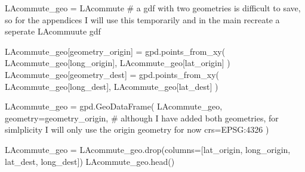 \documentclass[
  number]{elsarticle}
\newenvironment{Shaded}{\begin{snugshade}}{\end{snugshade}}
\newcommand{\CommentTok}[1]{\textcolor[rgb]{0.37,0.37,0.37}{#1}}
\newcommand{\NormalTok}[1]{\textcolor[rgb]{0.00,0.23,0.31}{#1}}
\newcommand{\OperatorTok}[1]{\textcolor[rgb]{0.37,0.37,0.37}{#1}}
\newcommand{\StringTok}[1]{\textcolor[rgb]{0.13,0.47,0.30}{#1}}
\begin{document}
\begin{Shaded}
\begin{Highlighting}[]
\NormalTok{LAcommute\_geo }\OperatorTok{=}\NormalTok{ LAcommute }\CommentTok{\# a gdf with two geometries is difficult to save, so for the appendices I will use this temporarily and in the main recreate a seperate LAcommuute gdf}

\NormalTok{LAcommute\_geo[}\StringTok{\textquotesingle{}geometry\_origin\textquotesingle{}}\NormalTok{] }\OperatorTok{=}\NormalTok{ gpd.points\_from\_xy(}
\NormalTok{    LAcommute\_geo[}\StringTok{\textquotesingle{}long\_origin\textquotesingle{}}\NormalTok{], LAcommute\_geo[}\StringTok{\textquotesingle{}lat\_origin\textquotesingle{}}\NormalTok{]}
\NormalTok{)}
\NormalTok{LAcommute\_geo[}\StringTok{\textquotesingle{}geometry\_dest\textquotesingle{}}\NormalTok{] }\OperatorTok{=}\NormalTok{ gpd.points\_from\_xy(}
\NormalTok{    LAcommute\_geo[}\StringTok{\textquotesingle{}long\_dest\textquotesingle{}}\NormalTok{], LAcommute\_geo[}\StringTok{\textquotesingle{}lat\_dest\textquotesingle{}}\NormalTok{]}
\NormalTok{)}

\NormalTok{LAcommute\_geo }\OperatorTok{=}\NormalTok{ gpd.GeoDataFrame(}
\NormalTok{    LAcommute\_geo,}
\NormalTok{    geometry}\OperatorTok{=}\StringTok{\textquotesingle{}geometry\_origin\textquotesingle{}}\NormalTok{,  }\CommentTok{\# although I have added both geometries, for simlplicity I will only use the origin geometry for now}
\NormalTok{    crs}\OperatorTok{=}\StringTok{\textquotesingle{}EPSG:4326\textquotesingle{}}
\NormalTok{)}

\NormalTok{LAcommute\_geo }\OperatorTok{=}\NormalTok{ LAcommute\_geo.drop(columns}\OperatorTok{=}\NormalTok{[}\StringTok{\textquotesingle{}lat\_origin\textquotesingle{}}\NormalTok{, }\StringTok{\textquotesingle{}long\_origin\textquotesingle{}}\NormalTok{, }\StringTok{\textquotesingle{}lat\_dest\textquotesingle{}}\NormalTok{, }\StringTok{\textquotesingle{}long\_dest\textquotesingle{}}\NormalTok{])}
\NormalTok{LAcommute\_geo.head()}
\end{Highlighting}
\end{Shaded}
\end{document}
